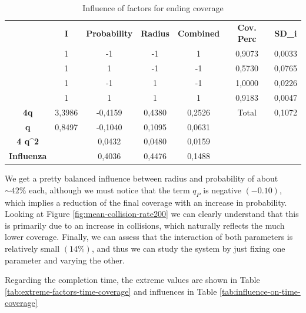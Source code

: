 \begin{table}[H]
\centering
\begin{tabular}{c|c|c|c|c|cc}
\cline{2-7}
 & \textbf{I} & \textbf{Probability} & \textbf{Radius} & \textbf{Combined} & \multicolumn{1}{c|}{\textbf{Cov. Perc}} & \multicolumn{1}{c|}{\textbf{SD\_i}} \\ \cline{2-7} 
 & 1 & -1 & -1 & 1 & \multicolumn{1}{c|}{0,9073} & \multicolumn{1}{c|}{0,0033} \\ \cline{2-7} 
 & 1 & 1 & -1 & -1 & \multicolumn{1}{c|}{0,5730} & \multicolumn{1}{c|}{0,0765} \\ \cline{2-7} 
 & 1 & -1 & 1 & -1 & \multicolumn{1}{c|}{1,0000} & \multicolumn{1}{c|}{0,0226} \\ \cline{2-7} 
 & 1 & 1 & 1 & 1 & \multicolumn{1}{c|}{0,9183} & \multicolumn{1}{c|}{0,0047} \\ \hline
\multicolumn{1}{|c|}{\textbf{4q}} & 3,3986 & -0,4159 & 0,4380 & 0,2526 & \multicolumn{1}{c|}{Total} & \multicolumn{1}{c|}{0,1072} \\ \hline
\multicolumn{1}{|c|}{\textbf{q}} & 0,8497 & -0,1040 & 0,1095 & 0,0631 &  &  \\ \cline{1-5}
\multicolumn{1}{|c|}{\textbf{4 q\textasciicircum{}2}} &  & 0,0432 & 0,0480 & 0,0159 &  &  \\ \cline{1-5}
\multicolumn{1}{|c|}{\textbf{Influenza}} &  & 0,4036 & 0,4476 & 0,1488 &  &  \\ \cline{1-5}
\end{tabular}
\caption{Influence of factors for ending coverage}
\label{tab:influence-on-end-coverage}
\end{table}


We get a pretty balanced influence between radius and probability of about $\sim 42\%$ each, although we must notice that the term $q_P$ is negative $(-0.10)$, which implies a reduction of the final coverage with an increase in probability. Looking at Figure \ref{fig:mean-collision-rate200} we can clearly understand that this is primarily due to an increase in collisions, which naturally reflects the much lower coverage. Finally, we can assess that the interaction of both parameters is relatively small $(14\%)$, and thus we can study the system by just fixing one parameter and varying the other.

Regarding the completion time, the extreme values are shown in Table \ref{tab:extreme-factors-time-coverage} and influences in Table \ref{tab:influence-on-time-coverage}

